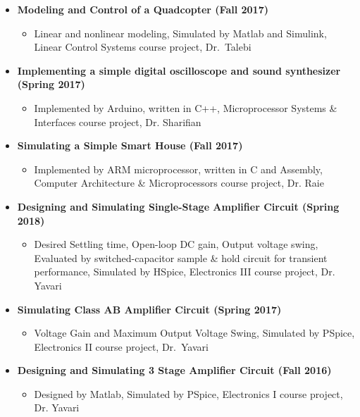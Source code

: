 \begin{itemize}
	\vspace{+1 em}
	\item \textbf{Modeling and Control of a Quadcopter (Fall 2017)} 
		\begin{itemize}
			\item Linear and nonlinear modeling, Simulated by Matlab and Simulink, Linear Control Systems
course project, \mbox{Dr. Talebi}
		\end{itemize}

	\vspace{+1 em}
	\item \textbf{Implementing a simple digital oscilloscope and sound synthesizer (Spring 2017)}
		\begin{itemize}
			\item Implemented by Arduino, written in C++, Microprocessor Systems \& Interfaces course project, Dr. Sharifian
		\end{itemize}

	\vspace{+1 em}
	\item \textbf{Simulating a Simple Smart House (Fall 2017)}
		\begin{itemize}
			\item Implemented by ARM microprocessor, written in C and Assembly, Computer Architecture \& Microprocessors course project, Dr. Raie
		\end{itemize}

		\vspace{+1 em}
	\item \textbf{Designing and Simulating Single-Stage Amplifier Circuit (Spring 2018)}
		\begin{itemize}
			\item Desired Settling time, Open-loop DC gain, Output voltage swing, Evaluated by switched-capacitor sample \& hold circuit for transient performance, Simulated by HSpice, Electronics III course project, Dr. Yavari
		\end{itemize}

	\vspace{+1 em}
	\item \textbf{Simulating Class AB Amplifier Circuit (Spring 2017)} 
		\begin{itemize}
			\item Voltage Gain and Maximum Output Voltage Swing, Simulated by PSpice, Electronics II course
project, \mbox{Dr. Yavari}
		\end{itemize}

			\vspace{+1 em}
	\item \textbf{Designing and Simulating 3 Stage Amplifier Circuit (Fall 2016)}
		\begin{itemize}
			\item Designed by Matlab, Simulated by PSpice, Electronics I course project, Dr. Yavari
		\end{itemize}
\end{itemize}

